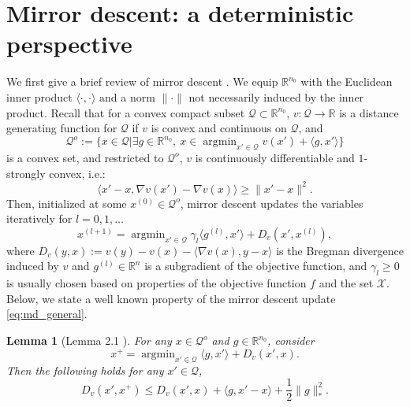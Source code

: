 \documentclass[11pt,fullpage,letterpaper]{article}
\newcommand{\mc}{\mathcal}
\newcommand{\R}{\mathbb{R}}
\DeclareMathOperator*{\argmin}{argmin}
\newtheorem{lemma}{Lemma}[section]
\begin{document}
\section{Mirror descent: a deterministic perspective}\label{sec:pathwise}
We first give a brief review of mirror descent \cite{Bubeck2015,LanBook,Nemirovski2004Prox}. We equip $\R^{n_0}$ with the Euclidean inner product $\langle \cdot,\cdot \rangle$ and a norm $\|\cdot\|$ not necessarily induced by the inner product. Recall that for a convex compact subset $\mc Q\subset \R^{n_0}$, $v:\mc Q\to \R$ is a distance generating function \cite{LanBook,NemirovskiRobustSA2009} for $\mc Q$ if 
$v$ is convex and continuous on $\mc Q$, and 
\begin{displaymath}
    \mc Q^o:=\{x\in \mc Q|\exists g\in \R^{n_0},~x\in \argmin_{x'\in \mc Q} v(x') +\langle g, x'\rangle \}
\end{displaymath}
is a convex set, and restricted to $\mc Q^o$, $v$ is continuously differentiable and $1$-strongly convex, i.e.:
\begin{displaymath}
    \langle x'-x,\nabla v(x')-\nabla v(x)\rangle\geq \|x'-x\|^2.
\end{displaymath}
Then, initialized at some $x^{(0)}\in \mc Q^o$, mirror descent updates the variables iteratively for $l = 0,1,\ldots$
\begin{equation}\label{eq:md_general}
    x^{(l+1)} = \argmin_{x'\in \mc Q} \gamma_l\langle g^{(l)},x'\rangle + D_{v}(x',x^{(l)}),
\end{equation}
where $D_{v}(y,x) := v(y) - v(x) - \langle \nabla v(x),y-x\rangle$ is the Bregman divergence induced by $v$ and $g^{(l)}\in \R^n$ is a subgradient of the objective function, and $\gamma_l\geq 0$ is usually chosen based on properties of the objective function $f$ and the set $\mc X$. Below, we state a well known property of the mirror descent update \eqref{eq:md_general}.
\begin{lemma}[Lemma 2.1 \cite{NemirovskiRobustSA2009}]\label{lm:MD-prop-lemma}
    For any $x\in \mc Q^o$ and $g\in \R^{n_0}$, consider
    \begin{displaymath}
            x^{+} = \argmin_{x'\in \mc Q} \langle g,x'\rangle + D_{v}(x',x).
    \end{displaymath}
    Then the following holds for any $x'\in \mc Q$,
    \begin{displaymath}
        D_v(x',x^{+})\leq D_v(x',x) + \langle  g, x'-x\rangle +\frac{1}{2}\|g\|_*^2.
    \end{displaymath}
\end{lemma}
\end{document}
